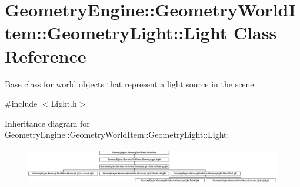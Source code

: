 \hypertarget{class_geometry_engine_1_1_geometry_world_item_1_1_geometry_light_1_1_light}{}\section{Geometry\+Engine\+::Geometry\+World\+Item\+::Geometry\+Light\+::Light Class Reference}
\label{class_geometry_engine_1_1_geometry_world_item_1_1_geometry_light_1_1_light}


Base class for world objects that represent a light source in the scene.  




{\ttfamily \#include $<$Light.\+h$>$}

Inheritance diagram for Geometry\+Engine\+::Geometry\+World\+Item\+::Geometry\+Light\+::Light\+:\begin{figure}[H]
\begin{center}
\leavevmode
\includegraphics[height=1.573034cm]{class_geometry_engine_1_1_geometry_world_item_1_1_geometry_light_1_1_light}
\end{center}
\end{figure}
